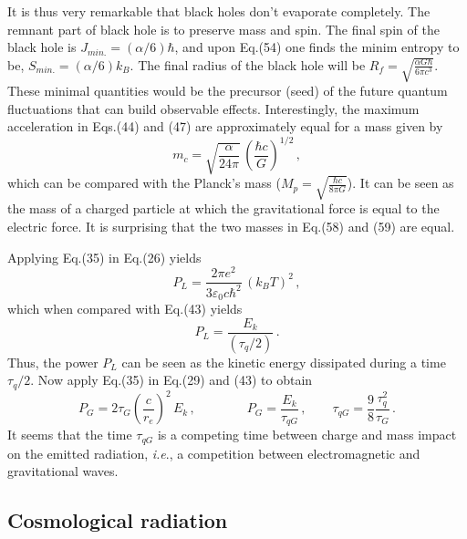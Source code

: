 \documentclass[12pt]{article}
\begin{document}
It is thus very remarkable that black holes don't evaporate completely. The remnant part of black hole is to preserve mass and spin. The final spin of the black hole is $J_{min.}=(\alpha/6)\hbar$, and upon Eq.(54) one finds the minim entropy to be, $S_{min.}=(\alpha/6)k_B.$ The final radius of the black hole will be $R_f=\sqrt{\frac{\alpha G\hbar}{6\pi c^3}}$. These minimal quantities would be the precursor (seed) of the future quantum fluctuations that can build observable effects.
Interestingly, the maximum acceleration in Eqs.(44) and (47) are approximately equal for a mass given by
\begin{equation}
m_c=\sqrt{\frac{\alpha}{24\pi}}\,\left(\frac{\hbar c}{G}\right)^{1/2}\,,
\end{equation}
which can be compared with the Planck's mass ($M_p=\sqrt{\frac{\hbar c}{8\pi G}}$). It can be seen as the mass of a charged particle at which the gravitational force is equal to the electric force. It is surprising  that the two masses in Eq.(58) and (59) are equal.

Applying Eq.(35) in Eq.(26) yields
\begin{equation}
P_L=\frac{2\pi e^2}{3\varepsilon_0c\hbar^2}\,(k_BT)^2\,,
\end{equation}
which when compared with Eq.(43) yields
\begin{equation}
P_L=\frac{E_k}{(\tau_q/2)}\,.
\end{equation}
Thus, the power $P_L$ can be seen as the kinetic energy dissipated during a time $\tau_q/2$. Now apply Eq.(35) in Eq.(29) and (43)  to obtain
\begin{equation}
P_G=2\tau_G\left(\frac{c}{r_e}\right)^2\,E_k\,,\qquad\qquad P_G=\frac{E_k}{\tau_{qG}}\,,\qquad \tau_{qG}=\frac{9}{8}\frac{\tau_q^2}{\tau_G}\,.
\end{equation}
It seems that the time $\tau_{qG}$ is a competing time between charge and mass impact on the  emitted radiation, \emph{i.e}., a competition between electromagnetic and gravitational waves.

\subsection{{Cosmological radiation}}
\end{document}
